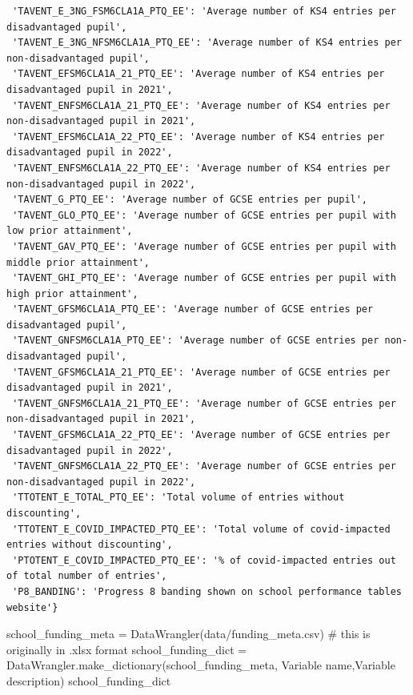 \documentclass[
  letterpaper,
  DIV=11,
  numbers=noendperiod]{scrartcl}
\newenvironment{Shaded}{\begin{snugshade}}{\end{snugshade}}
\newcommand{\CommentTok}[1]{\textcolor[rgb]{0.37,0.37,0.37}{#1}}
\newcommand{\NormalTok}[1]{\textcolor[rgb]{0.00,0.23,0.31}{#1}}
\newcommand{\OperatorTok}[1]{\textcolor[rgb]{0.37,0.37,0.37}{#1}}
\newcommand{\StringTok}[1]{\textcolor[rgb]{0.13,0.47,0.30}{#1}}
\begin{document}
\begin{verbatim}
 'TAVENT_E_3NG_FSM6CLA1A_PTQ_EE': 'Average number of KS4 entries per disadvantaged pupil',
 'TAVENT_E_3NG_NFSM6CLA1A_PTQ_EE': 'Average number of KS4 entries per non-disadvantaged pupil',
 'TAVENT_EFSM6CLA1A_21_PTQ_EE': 'Average number of KS4 entries per disadvantaged pupil in 2021',
 'TAVENT_ENFSM6CLA1A_21_PTQ_EE': 'Average number of KS4 entries per non-disadvantaged pupil in 2021',
 'TAVENT_EFSM6CLA1A_22_PTQ_EE': 'Average number of KS4 entries per disadvantaged pupil in 2022',
 'TAVENT_ENFSM6CLA1A_22_PTQ_EE': 'Average number of KS4 entries per non-disadvantaged pupil in 2022',
 'TAVENT_G_PTQ_EE': 'Average number of GCSE entries per pupil',
 'TAVENT_GLO_PTQ_EE': 'Average number of GCSE entries per pupil with low prior attainment',
 'TAVENT_GAV_PTQ_EE': 'Average number of GCSE entries per pupil with middle prior attainment',
 'TAVENT_GHI_PTQ_EE': 'Average number of GCSE entries per pupil with high prior attainment',
 'TAVENT_GFSM6CLA1A_PTQ_EE': 'Average number of GCSE entries per disadvantaged pupil',
 'TAVENT_GNFSM6CLA1A_PTQ_EE': 'Average number of GCSE entries per non-disadvantaged pupil',
 'TAVENT_GFSM6CLA1A_21_PTQ_EE': 'Average number of GCSE entries per disadvantaged pupil in 2021',
 'TAVENT_GNFSM6CLA1A_21_PTQ_EE': 'Average number of GCSE entries per non-disadvantaged pupil in 2021',
 'TAVENT_GFSM6CLA1A_22_PTQ_EE': 'Average number of GCSE entries per disadvantaged pupil in 2022',
 'TAVENT_GNFSM6CLA1A_22_PTQ_EE': 'Average number of GCSE entries per non-disadvantaged pupil in 2022',
 'TTOTENT_E_TOTAL_PTQ_EE': 'Total volume of entries without discounting',
 'TTOTENT_E_COVID_IMPACTED_PTQ_EE': 'Total volume of covid-impacted entries without discounting',
 'PTOTENT_E_COVID_IMPACTED_PTQ_EE': '% of covid-impacted entries out of total number of entries',
 'P8_BANDING': 'Progress 8 banding shown on school performance tables website'}
\end{verbatim}

\begin{Shaded}
\begin{Highlighting}[]
\NormalTok{school\_funding\_meta }\OperatorTok{=}\NormalTok{ DataWrangler(}\StringTok{\textquotesingle{}data/funding\_meta.csv\textquotesingle{}}\NormalTok{) }\CommentTok{\# this is originally in .xlsx format}
\NormalTok{school\_funding\_dict }\OperatorTok{=}\NormalTok{ DataWrangler.make\_dictionary(school\_funding\_meta, }\StringTok{\textquotesingle{}Variable name\textquotesingle{}}\NormalTok{,}\StringTok{\textquotesingle{}Variable description\textquotesingle{}}\NormalTok{)}
\NormalTok{school\_funding\_dict}
\end{Highlighting}
\end{Shaded}
\end{document}
